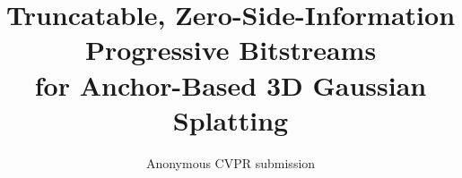 \documentclass[10pt,twocolumn,letterpaper]{article}
\title{Truncatable, Zero-Side-Information Progressive Bitstreams\\ for Anchor-Based 3D Gaussian Splatting}
\author{Anonymous CVPR submission}
\begin{document}
\maketitle







{
    \small
    
    
}

% 
\end{document}
